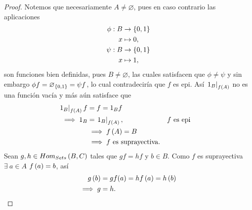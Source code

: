 \documentclass{article}
\begin{document}
\begin{lem}
\begin{proof}
			 Notemos que necesariamente $A\neq\varnothing$, pues en caso contrario las aplicaciones
			\begin{align*}
				\phi: B &\rightarrow \left\{0,1\right\}\\ x &\mapsto 0,\\
				\psi: B &\rightarrow \left\{0,1\right\}\\ x &\mapsto 1,
			\end{align*}			
			 son funciones bien definidas, pues $B\neq\varnothing$, las cuales satisfacen que $\phi\neq\psi$ y sin embargo $\phi f=\varnothing_{\left\{0,1\right\}}=\psi f$, lo cual contradeciría que $f$ es epi. Así $\left.1_B\right|_{f\left(A\right)}$ no es una función vacía y más aún satisface que
			\begin{align*}
				\left.1_B\right|_{f\left(A\right)}f&=f=1_B f\\
				\implies 1_B&=\left.1_B\right|_{f\left(A\right)}, && f\text{ es epi}\\
				&\implies f\left(A\right)=B\\
				&\implies f\text{ es suprayectiva.}
			\end{align*}
		 Sean $g,h\in Hom_{Sets}\left(B,C\right)$ tales que $gf=hf$ y $b\in B$. Como $f$ es suprayectiva $\exists\ a\in A$ $f\left(a\right)=b$, así
		\begin{align*}
			g\left(b\right)&=gf(a)=hf\left(a\right)=h\left(b\right)\\
			\implies g&=h.
		\end{align*}
		\end{proof}
	\end{lem}
\end{document}
